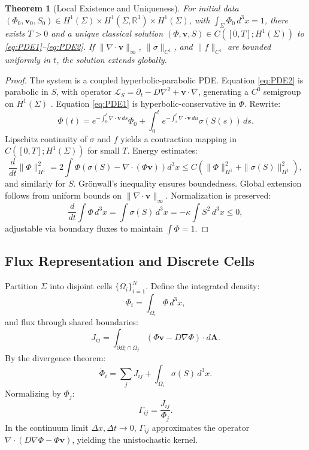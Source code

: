\documentclass[12pt]{article}
\newtheorem{theorem}{Theorem}
\begin{document}
\begin{theorem}[Local Existence and Uniqueness]
\label{thm:wellposed}
For initial data \((\Phi_0, \mathbf{v}_0, S_0) \in H^1(\Sigma) \times H^1(\Sigma, \mathbb{R}^3) \times H^1(\Sigma)\), with \(\int_\Sigma \Phi_0 \, d^3x = 1\), there exists \(T > 0\) and a unique classical solution \((\Phi, \mathbf{v}, S) \in C([0, T]; H^1(\Sigma))\) to \eqref{eq:PDE1}–\eqref{eq:PDE2}. If \(\|\nabla \cdot \mathbf{v}\|_\infty\), \(\|\sigma\|_{C^1}\), and \(\|f\|_{C^1}\) are bounded uniformly in \(t\), the solution extends globally.
\end{theorem}

\begin{proof}
The system is a coupled hyperbolic-parabolic PDE. Equation \eqref{eq:PDE2} is parabolic in \(S\), with operator \(\mathcal{L}_S = \partial_t - D \nabla^2 + \mathbf{v} \cdot \nabla\), generating a \(C^0\) semigroup on \(H^1(\Sigma)\) \citep{Risken1996}. Equation \eqref{eq:PDE1} is hyperbolic-conservative in \(\Phi\). Rewrite:
\[
\Phi(t) = e^{-\int_0^t \nabla \cdot \mathbf{v} \, ds} \Phi_0 + \int_0^t e^{-\int_s^t \nabla \cdot \mathbf{v} \, du} \sigma(S(s)) \, ds.
\]
Lipschitz continuity of \(\sigma\) and \(f\) yields a contraction mapping in \(C([0, T]; H^1(\Sigma))\) for small \(T\). Energy estimates:
\[
\frac{d}{dt} \|\Phi\|_{H^1}^2 = 2 \int \Phi \left( \sigma(S) - \nabla \cdot (\Phi \mathbf{v}) \right) d^3x \leq C (\|\Phi\|_{H^1}^2 + \|\sigma(S)\|_{H^1}^2),
\]
and similarly for \(S\). Grönwall’s inequality ensures boundedness. Global extension follows from uniform bounds on \(\|\nabla \cdot \mathbf{v}\|_\infty\). Normalization is preserved:
\[
\frac{d}{dt} \int \Phi \, d^3x = \int \sigma(S) \, d^3x = -\kappa \int S^2 \, d^3x \leq 0,
\]
adjustable via boundary fluxes to maintain \(\int \Phi = 1\).
\end{proof}

\subsection{Flux Representation and Discrete Cells}

Partition \(\Sigma\) into disjoint cells \(\{\Omega_i\}_{i=1}^N\). Define the integrated density:
\[
\Phi_i = \int_{\Omega_i} \Phi \, d^3x,
\]
and flux through shared boundaries:
\[
J_{ij} = \int_{\partial \Omega_i \cap \Omega_j} (\Phi \mathbf{v} - D \nabla \Phi) \cdot d\mathbf{A}.
\]
By the divergence theorem:
\[
\dot{\Phi}_i = \sum_j J_{ij} + \int_{\Omega_i} \sigma(S) \, d^3x.
\]
Normalizing by \(\Phi_j\):
\[
\Gamma_{ij} = \frac{J_{ij}}{\Phi_j}.
\]
In the continuum limit \(\Delta x, \Delta t \to 0\), \(\Gamma_{ij}\) approximates the operator \(\nabla \cdot (D \nabla \Phi - \Phi \mathbf{v})\), yielding the unistochastic kernel.
\end{document}
